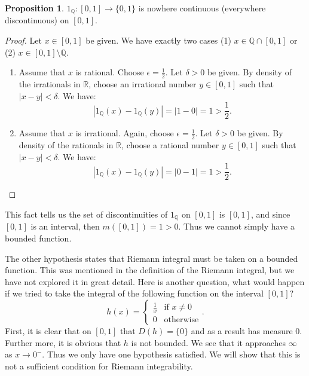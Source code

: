 \documentclass{article}
\theoremstyle{axiom} \newtheorem{axiom}{Axiom}
\theoremstyle{definition} \newtheorem{definition}{Definition}
\theoremstyle{example} \newtheorem{example}{Example}
\theoremstyle{proposition} \newtheorem{prop}{Proposition}
\theoremstyle{lemma} \newtheorem{lemma}{Lemma}
\newcommand{\Q}{\mathbb{Q}}  \newcommand{\R}{\mathbb{R}}
\begin{document}
\begin{prop}
$1_{\Q}:[0,1] \rightarrow \{0,1\}$ is nowhere continuous (everywhere discontinuous)
on $[0,1]$. 
\end{prop}
\begin{proof}
	Let $x \in [0,1]$ be given. We have exactly two cases (1) $x \in \Q \cap
	[0,1]$ or (2) $x \in [0,1]\setminus \Q$.
	\begin{enumerate}
		\item Assume that $x$ is rational. Choose $\epsilon = \frac{1}{2}$.
		Let $\delta > 0$ be given. By density of the irrationals in $\R$,
		choose an irrational number $y \in [0,1]$ such that $|x-y|<\delta$. 
		We have:
		\begin{equation*}
			|1_{\Q}(x) - 1_{\Q}(y)| = |1-0| =1>\frac{1}{2}.
		\end{equation*}
		\item Assume that $x$ is irrational. Again, choose $\epsilon =
		\frac{1}{2}$. Let $\delta > 0$ be given. By density of the rationals in
		$\R$, choose a rational number $y \in [0,1]$ such that $|x-y| < \delta$.
		We have:
		\begin{equation*}
			|1_{\Q}(x) - 1_{\Q}(y)| = |0-1| =1>\frac{1}{2}.
		\end{equation*}
	\end{enumerate}
\end{proof}
This fact tells us the set of discontinuities of $1_{\Q}$ on $[0,1]$ is $[0,1]$,
and since $[0,1]$ is an interval, then $m([0,1]) = 1 > 0$. Thus we cannot simply
have a bounded function.

The other hypothesis states that Riemann integral must be taken on a bounded
function. This was mentioned in the definition of the Riemann integral, but we
have not explored it in great detail. Here is another question, what would
happen if we tried to take the integral of the following function on the
interval $[0,1]$? 
\begin{equation}
	h(x) = \begin{cases}
		\frac{1}{x} & \text{if $x\neq 0$}\\
		0 & \text{otherwise} 
	\end{cases}.
\end{equation}
First, it is clear that on $[0,1]$ that $D(h) = \{0\}$  and as a result has measure 
$0$. Further more, it is obvious that $h$ is not bounded. We see that it approaches
$\infty$ as $x \rightarrow 0^-$. Thus we only have one hypothesis satisfied. 
We will show that this is not a sufficient condition for Riemann integrability.
\end{document}
